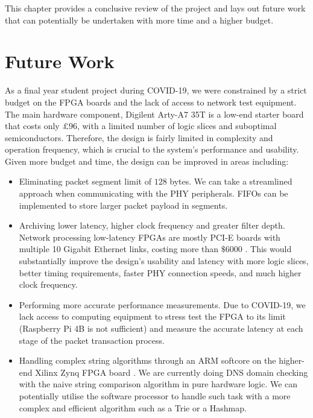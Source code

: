 \documentclass[a4paper]{report}
\begin{document}
This chapter provides a conclusive review of the project and lays out future work that can potentially be undertaken with more time and a higher budget.

\section{Future Work}

As a final year student project during COVID-19, we were constrained by a strict budget on the FPGA boards and the lack of access to network test equipment. The main hardware component, Digilent Arty-A7 35T is a low-end starter board that costs only $£96$, with a limited number of logic slices and suboptimal semiconductors. Therefore, the design is fairly limited in complexity and operation frequency, which is crucial to the system's performance and usability. Given more budget and time, the design can be improved in areas including:

\begin{itemize}
    \item Eliminating packet segment limit of $128$ bytes. We can take a streamlined approach when communicating with the PHY peripherals. FIFOs can be implemented to store larger packet payload in segments.
    \item Archiving lower latency, higher clock frequency and greater filter depth. Network processing low-latency FPGAs are mostly PCI-E boards with multiple 10 Gigabit Ethernet links, costing more than $\$6000$ \cite{netfpga-sume-digilent}. This would substantially improve the design's usability and latency with more logic slices, better timing requirements, faster PHY connection speeds, and much higher clock frequency.
    \item Performing more accurate performance measurements. Due to COVID-19, we lack access to computing equipment to stress test the FPGA to its limit (Raspberry Pi 4B is not sufficient) and measure the accurate latency at each stage of the packet transaction process.
    \item Handling complex string algorithms through an ARM softcore on the higher-end Xilinx Zynq FPGA board \cite{zynq-7000-xilinx}. We are currently doing DNS domain checking with the naive string comparison algorithm in pure hardware logic. We can potentially utilise the software processor to handle such task with a more complex and efficient algorithm such as a Trie or a Hashmap.
\end{itemize}
\end{document}
